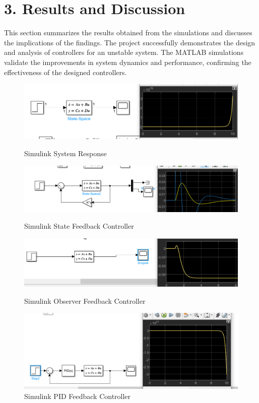 \documentclass[a4paper,12pt]{article}
\begin{document}
\section*{3. Results and Discussion}
This section summarizes the results obtained from the simulations and discusses the implications of the findings. The project successfully demonstrates the design and analysis of controllers for an unstable system. The MATLAB simulations validate the improvements in system dynamics and performance, confirming the effectiveness of the designed controllers.

\begin{figure}[h!]
    \centering
    \begin{minipage}{1\textwidth}
        \centering
        \includegraphics[width=\textwidth]{simulink_system_response.png}
        \caption{Simulink System Response}
    
    \end{minipage}
    \begin{minipage}{1\textwidth}
        \centering
        \includegraphics[width=\textwidth]{sl_sfc.png}
        \caption{Simulink State Feedback Controller}
    \end{minipage}
    \begin{minipage}{1\textwidth}
        \centering
        \includegraphics[width=\textwidth]{sl_obs.png}
        \caption{Simulink Observer Feedback Controller}
    \end{minipage}
    \begin{minipage}{1\textwidth}
        \centering
        \includegraphics[width=\textwidth]{sl_PID.png}
        \caption{Simulink PID Feedback Controller}
    \end{minipage}
\end{figure}
\end{document}
